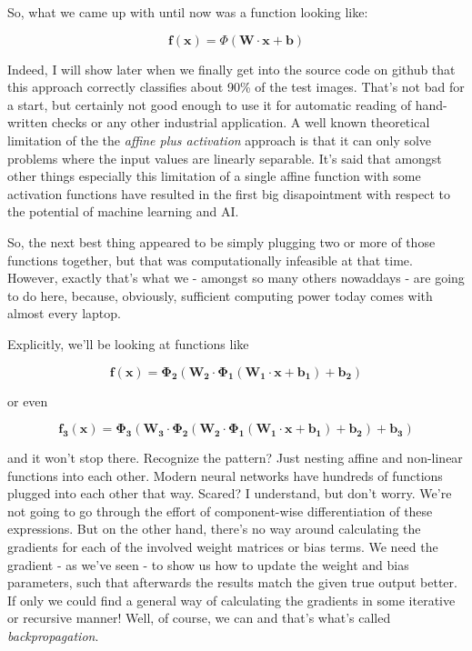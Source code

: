 \documentclass[]{report}
\begin{document}
So, what we came up with until now was a function looking like:

\begin{equation}
\mathbf{f}(\mathbf{x})=\Phi(\mathbf{W} \cdot \mathbf{x} + \mathbf{b})
\end{equation}

Indeed, I will show later when we finally get into the source code on github that this approach correctly classifies about 90\% of the test images. That's not bad for a start, but certainly not good enough to use it for automatic reading of hand-written checks or any other industrial application. A well known theoretical limitation of the the \emph{affine plus activation} approach is that it can only solve problems where the input values are linearly separable. It's said that amongst other things especially this limitation of a single affine function with some activation functions have resulted in the first big disapointment with respect to the potential of machine learning and AI. 

So, the next best thing appeared to be simply plugging two or more of those functions together, but that was computationally infeasible at that time. However, exactly that's what we - amongst so many others nowaddays - are going to do here, because, obviously, sufficient computing power today comes with almost every laptop.

Explicitly, we'll be looking at functions like

\begin{equation}
\mathbf{f}(\mathbf{x})=\mathbf{\Phi_2}(\mathbf{W_2} \cdot \mathbf{\Phi_1(\mathbf{W_1} \cdot \mathbf{x} + \mathbf{b_1})} + \mathbf{b_2})
\end{equation}

or even

\begin{equation} \label{eq:300}
\mathbf{f_3}(\mathbf{x})=\mathbf{\Phi_3}(\mathbf{W_3} \cdot \mathbf{\Phi_2(\mathbf{W_2} \cdot \mathbf{\Phi_1(\mathbf{W_1} \cdot \mathbf{x} + \mathbf{b_1})} + \mathbf{b_2})} + \mathbf{b_3}) 
\end{equation}

and it won't stop there. Recognize the pattern? Just nesting affine and non-linear functions into each other. Modern neural networks have hundreds of functions plugged into each other that way. Scared? I understand, but don't worry. We're not going to go through the effort of component-wise differentiation of these expressions. But on the other hand, there's no way around calculating the gradients for each of the involved weight matrices or bias terms. We need the gradient - as we've seen - to show us how to update the weight and bias parameters, such that afterwards the results match the given true output better. If only we could find a general way of calculating the gradients in some iterative or recursive manner! Well, of course, we can and that's what's called \emph{backpropagation}.
\end{document}
